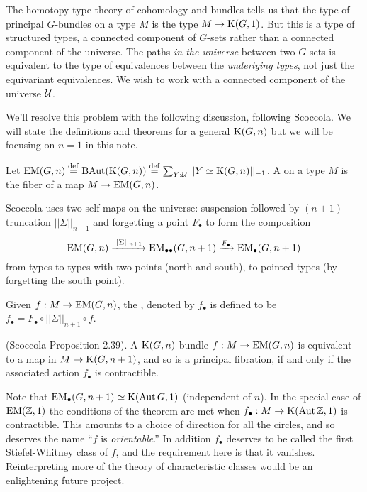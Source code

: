 The homotopy type theory of cohomology and bundles tells us that the type of principal \( G \)-bundles on a type \( M \) is the type \( M\to\mathrm{K}(G,1) \). But this is a type of structured types, a connected component of \( G \)-sets rather than a connected component of the universe. The paths \emph{in the universe} between two \( G \)-sets is equivalent to the type of equivalences between the \emph{underlying types}, not just the equivariant equivalences. We wish to work with a connected component of the universe \( \mathcal{U} \).

We'll resolve this problem with the following discussion, following Scoccola\cite{sco}. We will state the definitions and theorems for a general \( \mathrm{K}(G,n) \) but we will be focusing on \( n=1 \) in this note.

\begin{mydef}
Let \( \mathrm{EM}(G,n)\stackrel{\mathrm{def}}{=} \operatorname{BAut}(\mathrm{K}(G,n))\stackrel{\mathrm{def}}{=} \sum_{Y:\mathcal{U}}||Y\simeq \mathrm{K}(G,n)||_{-1}\). A  on a type \( M \) is the fiber of a map \( M\to\mathrm{EM}(G,n) \).
\end{mydef}

Scoccola uses two self-maps on the universe: suspension followed by \( (n+1) \)-truncation \( ||\Sigma||_{n+1} \) and forgetting a point \( F_\bullet \) to form the composition 
\[ 
\mathrm{EM}(G,n)\xrightarrow[]{||\Sigma||_{n+1}} \mathrm{EM}_{\bullet\bullet}(G,n+1)\xrightarrow[]{F_\bullet}\mathrm{EM_{\bullet}}(G,n+1)
\]
from types to types with two points (north and south), to pointed types (by forgetting the south point).

\begin{mydef}
Given \( f:M\to\mathrm{EM}(G,n) \), the , denoted by \( f_\bullet \) is defined to be \( f_\bullet=F_\bullet\circ||\Sigma||_{n+1}\circ f \).
\end{mydef}

\begin{mythm}
(Scoccola\cite{sco} Proposition 2.39). A \( \mathrm{K}(G,n) \) bundle \( f:M\to\mathrm{EM}(G,n) \) is equivalent to a map in \( M\to\mathrm{K}(G,n+1) \), and so is a principal fibration, if and only if the associated action \( f_\bullet \) is contractible.
\end{mythm}

Note that \( \mathrm{EM_{\bullet}}(G,n+1)\simeq \mathrm{K}(\operatorname{Aut} G,1) \) (independent of \( n \)). In the special case of \( \mathrm{EM}(\mathbb{Z},1) \) the conditions of the theorem are met when \( f_\bullet:M\to\mathrm{K}(\operatorname{Aut} \mathbb{Z}, 1) \) is contractible. This amounts to a choice of direction for all the circles, and so deserves the name ``\( f \) is \emph{orientable}.'' In addition \( f_\bullet \) deserves to be called the first Stiefel-Whitney class of \( f \), and the requirement here is that it vanishes. Reinterpreting more of the theory of characteristic classes would be an enlightening future project.

